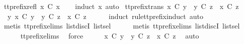 \begin{isabellebody}
\isanewline
{}\isamarkupfalse%
\ tt{\isacharunderscore}prefix{\isacharunderscore}refl{\isacharcolon}\ {\isachardoublequoteopen}x\ {\isasymle}\isactrlsub C\ x{\isachardoublequoteclose}\isanewline
%
\isadelimproof
\ \ %
\endisadelimproof
%
\isatagproof
{}\isamarkupfalse%
\ {\isacharparenleft}induct\ x{\isacharcomma}\ auto{\isacharparenright}%
\endisatagproof
{\isafoldproof}%
%
\isadelimproof
\isanewline
%
\endisadelimproof
\isanewline
{}\isamarkupfalse%
\ tt{\isacharunderscore}prefix{\isacharunderscore}trans{\isacharcolon}\ {\isachardoublequoteopen}x\ {\isasymle}\isactrlsub C\ y\ {\isasymLongrightarrow}\ y\ {\isasymle}\isactrlsub C\ z\ {\isasymLongrightarrow}\ x\ {\isasymle}\isactrlsub C\ z{\isachardoublequoteclose}\isanewline
%
\isadelimproof
%
\endisadelimproof
%
\isatagproof
{}\isamarkupfalse%
\ {\isacharminus}\isanewline
\ \ \isamarkupfalse%
\ {\isachardoublequoteopen}{\isasymexists}\ y{\isachardot}\ x\ {\isasymle}\isactrlsub C\ y\ {\isasymand}\ y\ {\isasymle}\isactrlsub C\ z\ {\isasymLongrightarrow}\ x\ {\isasymle}\isactrlsub C\ z{\isachardoublequoteclose}\isanewline
\ \ \ \ \isamarkupfalse%
\ {\isacharparenleft}induct\ rule{\isacharcolon}tt{\isacharunderscore}prefix{\isachardot}induct{\isacharcomma}\ auto{\isacharparenright}\isanewline
\ \ \ \ \isamarkupfalse%
\ {\isacharparenleft}metis\ tt{\isacharunderscore}prefix{\isachardot}elims{\isacharparenleft}{}{\isacharparenright}\ list{\isachardot}discI\ list{\isachardot}sel{\isacharparenleft}{}{\isacharparenright}{\isacharparenright}\isanewline
\ \ \ \ \isamarkupfalse%
\ {\isacharparenleft}metis\ tt{\isacharunderscore}prefix{\isachardot}elims{\isacharparenleft}{}{\isacharparenright}\ list{\isachardot}discI\ list{\isachardot}sel{\isacharparenleft}{}{\isacharparenright}{\isacharparenright}\isanewline
\ \ \ \ \isamarkupfalse%
\ tt{\isacharunderscore}prefix{\isachardot}elims{\isacharparenleft}{}{\isacharparenright}\ \isamarkupfalse%
\ force\isanewline
\ \ \isamarkupfalse%
\ \isamarkupfalse%
\ {\isachardoublequoteopen}x\ {\isasymle}\isactrlsub C\ y\ {\isasymLongrightarrow}\ y\ {\isasymle}\isactrlsub C\ z\ {\isasymLongrightarrow}\ x\ {\isasymle}\isactrlsub C\ z{\isachardoublequoteclose}\ \isamarkupfalse%
\ auto\isanewline
{}\isamarkupfalse%
%
\endisatagproof
{\isafoldproof}%
%
\isadelimproof
\isanewline
%
\endisadelimproof
\isanewline

\end{isabellebody}
